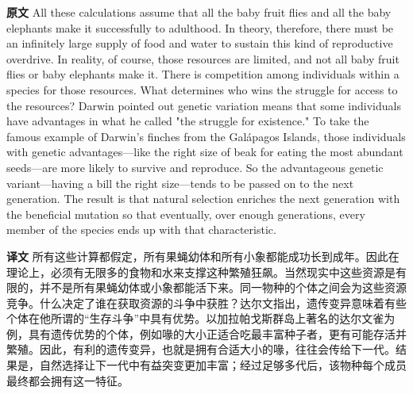 \documentclass[UTF8,zihao=-4]{ctexart}
\newcommand{\BodyFont}{\fontsize{10.5pt}{15.5pt}\selectfont}
\renewenvironment{quote}{\par\noindent\begingroup\BodyFont}{\par\endgroup}
\begin{document}
\begin{quote}
\noindent\textbf{原文} All these calculations assume that all the baby fruit flies and all the baby elephants make it successfully to adulthood. In theory, therefore, there must be an infinitely large supply of food and water to sustain this kind of reproductive overdrive. In reality, of course, those resources are limited, and not all baby fruit flies or baby elephants make it. There is competition among individuals within a species for those resources. What determines who wins the struggle for access to the resources? Darwin pointed out genetic variation means that some individuals have advantages in what he called "the struggle for existence." To take the famous example of Darwin's finches from the Galápagos Islands, those individuals with genetic advantages---like the right size of beak for eating the most abundant seeds---are more likely to survive and reproduce. So the advantageous genetic variant---having a bill the right size---tends to be passed on to the next generation. The result is that natural selection enriches the next generation with the beneficial mutation so that eventually, over enough generations, every member of the species ends up with that characteristic.

\smallskip
\noindent\textbf{译文} 所有这些计算都假定，所有果蝇幼体和所有小象都能成功长到成年。因此在理论上，必须有无限多的食物和水来支撑这种繁殖狂飙。当然现实中这些资源是有限的，并不是所有果蝇幼体或小象都能活下来。同一物种的个体之间会为这些资源竞争。什么决定了谁在获取资源的斗争中获胜？达尔文指出，遗传变异意味着有些个体在他所谓的“生存斗争”中具有优势。以加拉帕戈斯群岛上著名的达尔文雀为例，具有遗传优势的个体，例如喙的大小正适合吃最丰富种子者，更有可能存活并繁殖。因此，有利的遗传变异，也就是拥有合适大小的喙，往往会传给下一代。结果是，自然选择让下一代中有益突变更加丰富；经过足够多代后，该物种每个成员最终都会拥有这一特征。
\end{quote}
\end{document}
